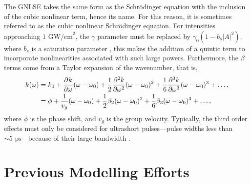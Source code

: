 The GNLSE takes the same form as the Schr\"odinger equation with the inclusion of the cubic nonlinear term, hence its name. For this reason, it is sometimes referred to as the cubic nonlinear Schr\"odinger equation. For intensities approaching $1 \text{ GW/cm}^2$, the $\gamma$ parameter must be replaced by $\gamma_0 (1 - b_s |A|^2)$, where $b_s$ is a saturation parameter \cite{agrawal2013}, this makes the addition of a quintic term to incorporate nonlinearities associated with such large powers. Furthermore, the $\beta$ terms come from a Taylor expansion of the wavenumber, that is,
\begin{align*}
k(\omega) &= k_0 + \pdiff{k}{\omega}(\omega - \omega_0) + \frac{1}{2} \pdiff[2]{k}{\omega}(\omega - \omega_0)^2 + \frac{1}{6} \pdiff[3]{k}{\omega}(\omega - \omega_0)^3 + \dots, \\
&= \phi + \frac{1}{v_g}(\omega - \omega_0) + \frac{1}{2}\beta_2 (\omega - \omega_0)^2 + \frac{1}{6}\beta_3 (\omega - \omega_0)^3 + \dots,
\end{align*}
where $\phi$ is the phase shift, and $v_g$ is the group velocity. Typically, the third order effects must only be considered for ultrashort pulses---pulse widths less than $\sim5 \text{ ps}$---because of their large bandwidth \cite{agrawal2013}.




\section{Previous Modelling Efforts}

